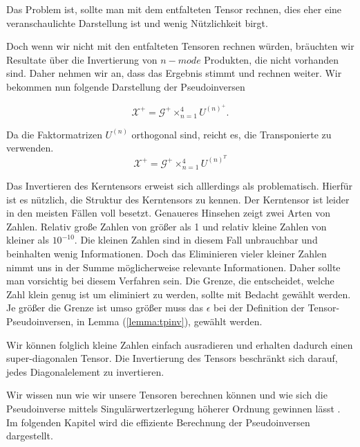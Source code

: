 Das Problem ist, sollte man mit dem entfalteten Tensor rechnen, dies eher eine veranschaulichte Darstellung ist und wenig Nützlichkeit birgt.

Doch wenn wir nicht mit den entfalteten Tensoren rechnen würden, bräuchten wir Resultate über die Invertierung von $n-mode$ Produkten, die nicht vorhanden sind. Daher nehmen wir an, dass das Ergebnis stimmt und rechnen weiter. Wir bekommen nun folgende Darstellung der Pseudoinversen

\begin{equation} \label{eq:pinv}
\pmb{\mathscr{X}}^{+} = \pmb{\mathscr{G}}^{+} \times_{n=1}^{4} U^{ (n) ^{+} }.
\end{equation}

Da die Faktormatrizen $U^{(n)}$ orthogonal sind, reicht es, die Transponierte zu verwenden.
\begin{equation}
\pmb{\mathscr{X}}^+ = \pmb{\mathscr{G}}^{+} \times_{n=1}^{4} U^{ (n) ^{T} }
\end{equation}

Das Invertieren des Kerntensors erweist sich alllerdings als problematisch.
Hierfür ist es nützlich, die Struktur des Kerntensors zu kennen. Der Kerntensor ist leider in den meisten Fällen voll besetzt. Genaueres Hinsehen zeigt zwei Arten von Zahlen. Relativ große Zahlen von größer als 1 und relativ kleine Zahlen von kleiner als $10^{-10}$. 
Die kleinen Zahlen sind in diesem Fall unbrauchbar und beinhalten wenig Informationen. Doch das Eliminieren vieler kleiner Zahlen nimmt uns in der Summe möglicherweise relevante Informationen.
Daher sollte man vorsichtig bei diesem Verfahren sein. Die Grenze, die entscheidet, welche Zahl klein genug ist um eliminiert zu werden, sollte mit Bedacht gewählt werden. Je größer die Grenze ist umso größer muss das $\epsilon$ bei der Definition der Tensor-Pseudoinversen, in Lemma (\ref{lemma:tpinv}), gewählt werden.

Wir können folglich kleine Zahlen einfach ausradieren und erhalten dadurch einen super-diagonalen Tensor. Die Invertierung des Tensors beschränkt sich darauf, jedes Diagonalelement zu invertieren.

Wir wissen nun wie wir unsere Tensoren berechnen können und wie sich die Pseudoinverse mittels Singulärwertzerlegung höherer Ordnung gewinnen lässt . \\
Im folgenden Kapitel wird die effiziente Berechnung der Pseudoinversen dargestellt.



